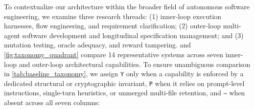 \documentclass[11pt,a4paper,copyright]{google}
\begin{document}
To contextualize our architecture within the broader field of autonomous software engineering, we examine three research threads: (1) inner-loop execution harnesses, flow engineering, and requirement clarification; (2) outer-loop multi-agent software development and longitudinal specification management; and (3) mutation testing, oracle adequacy, and reward tampering.  and \cref{fig:taxonomy_quadrant} compare 14 representative systems across seven inner-loop and outer-loop architectural capabilities. To ensure unambiguous comparison in \cref{tab:baseline_taxonomy}, we assign \texttt{Y} only when a capability is enforced by a dedicated structural or cryptographic invariant, \texttt{P} when it relies on prompt-level instructions, single-turn heuristics, or unmerged multi-file retention, and \texttt{--} when absent across all seven columns:
\end{document}
